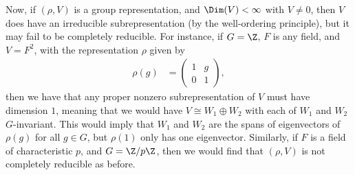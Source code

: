 \documentclass[10pt]{mypackage}
\begin{document}
Now, if $\left( \rho,V \right)$ is a group representation, and $\Dim(V) < \infty$ with $V\neq 0$, then $V$ does have an irreducible subrepresentation (by the well-ordering principle), but it may fail to be completely reducible. For instance, if $G = \Z$, $F$ is any field, and $V = F^2$, with the representation $\rho$ given by
\begin{align*}
  \rho(g) &= \begin{pmatrix}1 & g \\ 0 & 1\end{pmatrix},
\end{align*}
then we have that any proper nonzero subrepresentation of $V$ must have dimension $1$, meaning that we would have $V\cong W_1\oplus W_2$ with each of $W_1$ and $W_2$ $G$-invariant. This would imply that $W_1$ and $W_2$ are the spans of eigenvectors of $\rho(g)$ for all $g\in G$, but $\rho(1)$ only has one eigenvector. Similarly, if $F$ is a field of characteristic $p$, and $G = \Z/p\Z$, then we would find that $\left( \rho,V \right)$ is not completely reducible as before.
\end{document}
